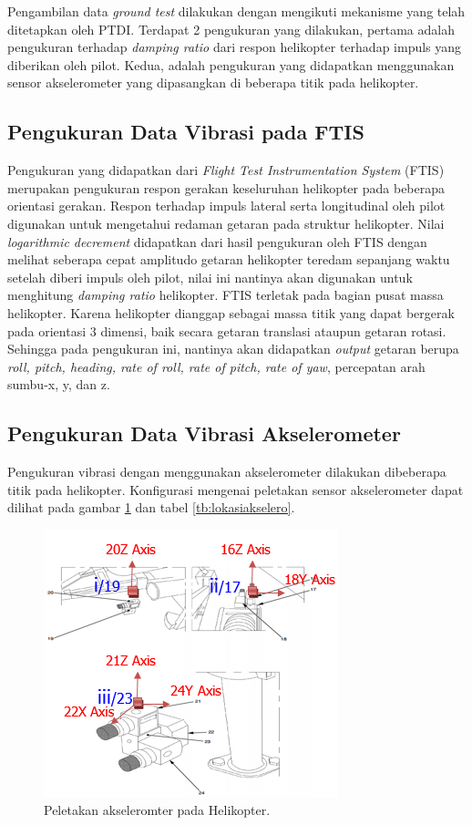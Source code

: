 Pengambilan data \textit{ground test} dilakukan dengan mengikuti mekanisme yang telah ditetapkan oleh PTDI. Terdapat 2 pengukuran yang dilakukan, pertama adalah pengukuran terhadap \textit{damping ratio} dari respon helikopter terhadap impuls yang diberikan oleh pilot. Kedua, adalah pengukuran yang didapatkan menggunakan sensor akselerometer yang dipasangkan di beberapa titik pada helikopter.

\subsection{Pengukuran Data Vibrasi pada FTIS}
Pengukuran yang didapatkan dari \textit{Flight Test Instrumentation System} (FTIS) merupakan pengukuran respon gerakan keseluruhan helikopter pada beberapa orientasi gerakan. Respon terhadap impuls lateral serta longitudinal oleh pilot digunakan untuk mengetahui redaman getaran pada struktur helikopter. Nilai \textit{logarithmic decrement} didapatkan dari hasil pengukuran oleh FTIS dengan melihat seberapa cepat amplitudo getaran helikopter teredam sepanjang waktu setelah diberi impuls oleh pilot, nilai ini nantinya akan digunakan untuk menghitung \textit{damping ratio} helikopter. FTIS terletak pada bagian pusat massa helikopter. Karena helikopter dianggap sebagai massa titik yang dapat bergerak pada orientasi 3 dimensi, baik secara getaran translasi ataupun getaran rotasi. Sehingga pada pengukuran ini, nantinya akan didapatkan \textit{output} getaran berupa \textit{roll, pitch, heading, rate of roll, rate of pitch, rate of yaw}, percepatan arah sumbu-x, y, dan z.

\subsection{Pengukuran Data Vibrasi Akselerometer}
\label{Pengukuran Data Vibrasi Akselerometer}

Pengukuran vibrasi dengan menggunakan akselerometer dilakukan dibeberapa titik pada helikopter. Konfigurasi mengenai peletakan sensor akselerometer dapat dilihat pada gambar \ref{peletakan_sensor.png} dan tabel \ref{tb:lokasiakselero}.

\begin{figure}[H]
	\centering
	\includegraphics[width=0.6\linewidth]{gambar/peletakan_sensor.png}
	\caption{Peletakan akseleromter pada Helikopter.}
	\label{peletakan_sensor.png}
\end{figure}

